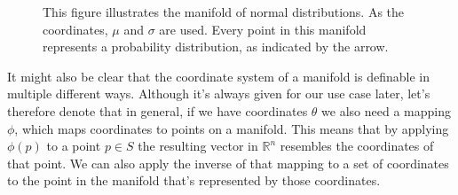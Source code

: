 \begin{figure}
	\centering
{}
\caption{This figure illustrates the manifold of normal distributions. As the coordinates, $\mu$ and $\sigma$ are used. Every point in this manifold represents a probability distribution, as indicated by the arrow. \label{fig:NormalDistributionManifold}}
\end{figure}
It might also be clear that the coordinate system of a manifold is definable in multiple different ways. Although it's always given for our use case later, let's therefore denote that in general, if we have coordinates $\theta$ we also need a mapping $\phi$, which maps coordinates to points on a manifold. This means that by applying $\phi(p)$ to a point $p\in S$ the resulting vector in $\mathbb{R}^n$ resembles the coordinates of that point. We can also apply the inverse of that mapping to a set of coordinates to the point in the manifold that's represented by those coordinates.

